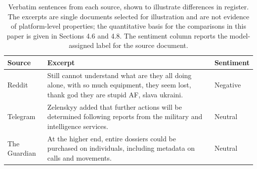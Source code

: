 \begin{table}[htbp]
\centering
\caption{Verbatim sentences from each source, shown to illustrate differences in register. The excerpts are single documents selected for illustration and are not evidence of platform-level properties; the quantitative basis for the comparisons in this paper is given in Sections 4.6 and 4.8. The sentiment column reports the model-assigned label for the source document.}
\label{tab:narrative_fragments}
\small
\begin{tabularx}{\textwidth}{l X l}
\toprule
\textbf{Source} & \textbf{Excerpt} & \textbf{Sentiment} \\
\midrule
Reddit & Still cannot understand what are they all doing alone, with so much equipment, they seem lost, thank god they are stupid AF, slava ukraini. & Negative \\
\addlinespace
Telegram & Zelenskyy added that further actions will be determined following reports from the military and intelligence services. & Neutral \\
\addlinespace
The Guardian & At the higher end, entire dossiers could be purchased on individuals, including metadata on calls and movements. & Neutral \\
\bottomrule
\end{tabularx}
\end{table}

